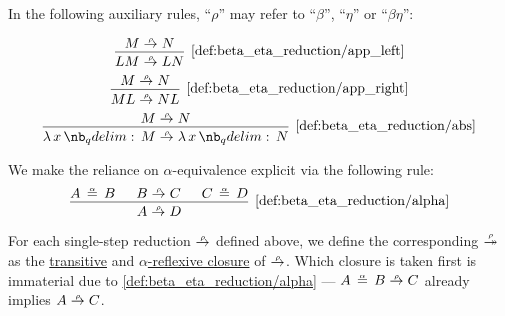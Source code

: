 \begin{definition}
\begin{thmenum}
     In the following auxiliary rules, \enquote{\( \rho \)} may refer to \enquote{\( \beta \)}, \enquote{\( \eta \)} or \enquote{\( \beta\eta \)}:
    \begin{ThreeColumns}
      \begin{equation*}\taglabel[\ensuremath{ \logic{App}_\rho^L }]{def:beta_eta_reduction/app_left}
        \begin{prooftree}
          \hypo{ M \redrel{\rho} N }
          \infer1[\ref{def:beta_eta_reduction/app_left}]{ LM \redrel{\rho} LN }
        \end{prooftree}
      \end{equation*}
    \BeginSecondColumn
      \begin{equation*}\taglabel[\ensuremath{ \logic{App}_\rho^R }]{def:beta_eta_reduction/app_right}
        \begin{prooftree}
          \hypo{ M \redrel{\rho} N }
          \infer1[\ref{def:beta_eta_reduction/app_right}]{ ML \redrel{\rho} NL }
        \end{prooftree}
      \end{equation*}
    \BeginThirdColumn
      \begin{equation*}\taglabel[\ensuremath{ \logic{Abs}_\rho }]{def:beta_eta_reduction/abs}
        \begin{prooftree}
          \hypo{ M \redrel{\rho} N }
          \infer1[\ref{def:beta_eta_reduction/abs}]{ \qabs x M \redrel{\rho} \qabs x N }
        \end{prooftree}
      \end{equation*}
    \end{ThreeColumns}

    We make the reliance on \( \alpha \)-equivalence explicit via the following rule:
    \begin{equation*}\taglabel[\ensuremath{ \logic{Alpha}_\rho }]{def:beta_eta_reduction/alpha}
      \begin{prooftree}
        \hypo{ A \aequiv B }
        \hypo{ B \redrel{\rho} C }
        \hypo{ C \aequiv D }
        \infer3[\ref{def:beta_eta_reduction/alpha}]{ A \redrel{\rho} D }.
      \end{prooftree}
    \end{equation*}

     For each single-step reduction \( {\redrel{\rho}} \) defined above, we define the corresponding  \( {\redrel*{\rho}} \) as the \hyperref[def:relation_closures/transitive]{transitive} and \hyperref[def:alpha_reflexive_closure]{\( \alpha \)-reflexive closure} of \( {\redrel{\rho}} \). Which closure is taken first is immaterial due to \ref{def:beta_eta_reduction/alpha} --- \( A \aequiv B \redrel{\rho} C \) already implies \( A \redrel{\rho} C \).


\end{thmenum}
\end{definition}
